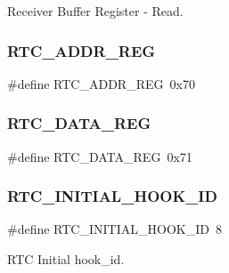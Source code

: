 Receiver Buffer Register -\/ Read. 

\hypertarget{group___serial_ga710b98232df2c563009e6f8a6cd18220}{}\label{group___serial_ga710b98232df2c563009e6f8a6cd18220} 
\subsubsection{\texorpdfstring{R\+T\+C\+\_\+\+A\+D\+D\+R\+\_\+\+R\+EG}{RTC\_ADDR\_REG}}
{\footnotesize\ttfamily \#define R\+T\+C\+\_\+\+A\+D\+D\+R\+\_\+\+R\+EG~0x70}

\hypertarget{group___serial_ga2f258a00c59c3f347c8d2d4a75471ce0}{}\label{group___serial_ga2f258a00c59c3f347c8d2d4a75471ce0} 
\subsubsection{\texorpdfstring{R\+T\+C\+\_\+\+D\+A\+T\+A\+\_\+\+R\+EG}{RTC\_DATA\_REG}}
{\footnotesize\ttfamily \#define R\+T\+C\+\_\+\+D\+A\+T\+A\+\_\+\+R\+EG~0x71}

\hypertarget{group___serial_gaa03bb5fe5bddcdd5bf15801d73f2c9c2}{}\label{group___serial_gaa03bb5fe5bddcdd5bf15801d73f2c9c2} 
\subsubsection{\texorpdfstring{R\+T\+C\+\_\+\+I\+N\+I\+T\+I\+A\+L\+\_\+\+H\+O\+O\+K\+\_\+\+ID}{RTC\_INITIAL\_HOOK\_ID}}
{\footnotesize\ttfamily \#define R\+T\+C\+\_\+\+I\+N\+I\+T\+I\+A\+L\+\_\+\+H\+O\+O\+K\+\_\+\+ID~8}



R\+TC Initial hook\+\_\+id. 

\hypertarget{group___serial_ga4e22feb6ffbc1cda32fadff5c740dc51}{}\label{group___serial_ga4e22feb6ffbc1cda32fadff5c740dc51} 
